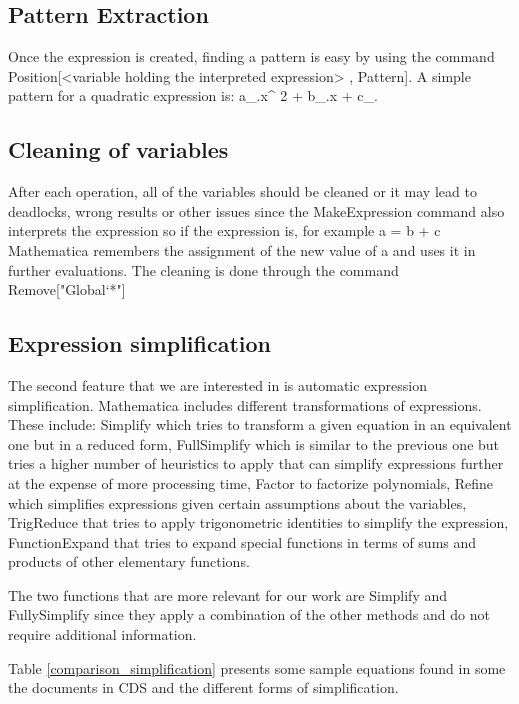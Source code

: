\subsection{Pattern Extraction}
Once the expression is created, finding a pattern is easy by using the command {\codefont Position[<variable holding the interpreted expression> , Pattern]}. A simple pattern for a quadratic expression is: {\codefont a\_.x\^{} 2 + b\_.x + c\_.} 

\subsection{Cleaning of variables}
After each operation, all of the variables should be cleaned or it may lead to deadlocks, wrong results or other issues since the {\codefont MakeExpression} command also interprets the expression so if the expression is, for example {\codefont a = b + c} Mathematica remembers the assignment of the new value of {\codefont a} and uses it in further evaluations. The cleaning is done through the command {\codefont Remove["Global`*"]}


\subsection{Expression simplification}
The second feature that we are interested in is automatic expression simplification.
Mathematica includes different transformations of expressions. These include: {\codefont Simplify} which tries to transform a given equation in an equivalent one but in a reduced form, {\codefont FullSimplify} which is similar to the previous one but tries a higher number of heuristics to apply that can simplify expressions further at the expense of more processing time, {\codefont Factor} to factorize polynomials, {\codefont Refine} which simplifies expressions given certain assumptions about the variables, {\codefont TrigReduce} that tries to apply trigonometric identities to simplify the expression, {\codefont FunctionExpand} that tries to expand special functions in terms of sums and products of other elementary functions. 

The two functions that are more relevant for our work are {\codefont Simplify} and {\codefont FullySimplify} since they apply a combination of the other methods and do not require additional information.

Table \ref{comparison_simplification} presents some sample equations found in some the documents in CDS and the different forms of simplification.

